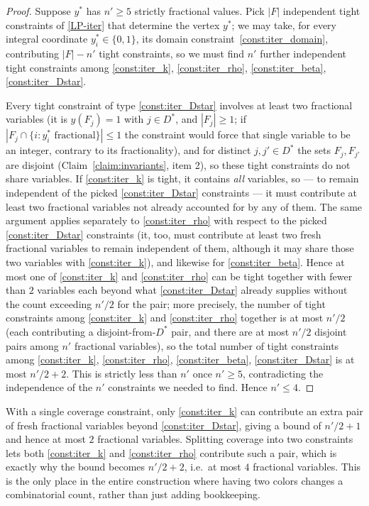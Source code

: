 \documentclass[a4paper,11pt]{article}
\begin{document}
\begin{proof}
Suppose $y^*$ has $n'\ge5$ strictly fractional values. Pick $|F|$
independent tight constraints of \eqref{LP-iter} that determine the
vertex $y^*$; we may take, for every integral coordinate $y^*_i\in\{0,1\}$,
its domain constraint~\eqref{const:iter_domain}, contributing $|F|-n'$
tight constraints, so we must find $n'$ further independent tight
constraints among \eqref{const:iter_k}, \eqref{const:iter_rho},
\eqref{const:iter_beta}, \eqref{const:iter_Dstar}.

Every tight constraint of type \eqref{const:iter_Dstar} involves at
least two fractional variables (it is $y(F_j)=1$ with $j\in D^*$, and
$|F_j|\ge1$; if $|F_j\cap\{i:y^*_i\text{ fractional}\}|\le1$ the
constraint would force that single variable to be an integer, contrary
to its fractionality), and for distinct $j,j'\in D^*$ the sets $F_j,F_{j'}$
are disjoint (Claim~\ref{claim:invariants}, item 2), so these tight
constraints do not share variables. If \eqref{const:iter_k} is tight, it
contains \emph{all} variables, so — to remain independent of the picked
\eqref{const:iter_Dstar} constraints — it must contribute at least two
fractional variables not already accounted for by any of them. The same
argument applies separately to \eqref{const:iter_rho} with respect to the
picked \eqref{const:iter_Dstar} constraints (it, too, must contribute at
least two fresh fractional variables to remain independent of them,
although it may share those two variables with \eqref{const:iter_k}),
and likewise for \eqref{const:iter_beta}. Hence at most one of
\eqref{const:iter_k} and \eqref{const:iter_rho} can be tight together
with fewer than $2$ variables each beyond what \eqref{const:iter_Dstar}
already supplies without the count exceeding $n'/2$ for the pair; more
precisely, the number of tight constraints among \eqref{const:iter_k}
and \eqref{const:iter_rho} together is at most $n'/2$ (each contributing
a disjoint-from-$D^*$ pair, and there are at most $n'/2$ disjoint pairs
among $n'$ fractional variables), so the total number of tight
constraints among \eqref{const:iter_k}, \eqref{const:iter_rho},
\eqref{const:iter_beta}, \eqref{const:iter_Dstar} is at most $n'/2+2$.
This is strictly less than $n'$ once $n'\ge5$, contradicting the
independence of the $n'$ constraints we needed to find. Hence $n'\le4$.
\end{proof}

\begin{remark}
With a single coverage constraint, only \eqref{const:iter_k} can
contribute an extra pair of fresh fractional variables beyond
\eqref{const:iter_Dstar}, giving a bound of $n'/2+1$ and hence at most
$2$ fractional variables. Splitting coverage into two constraints lets
both \eqref{const:iter_k} and \eqref{const:iter_rho} contribute such a
pair, which is exactly why the bound becomes $n'/2+2$, i.e.\ at most $4$
fractional variables. This is the only place in the entire construction
where having two colors changes a combinatorial count, rather than just
adding bookkeeping.
\end{remark}
\end{document}
